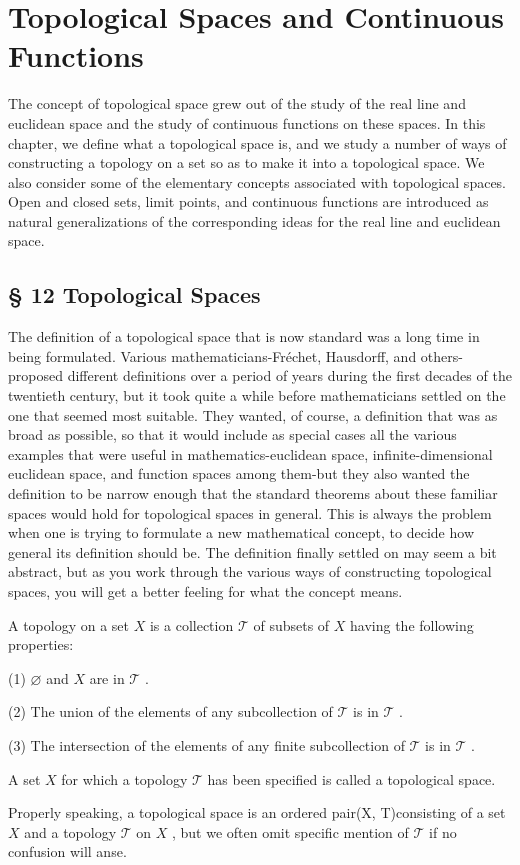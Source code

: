\chapter{Topological Spaces and Continuous Functions}

The concept of topological space grew out of the study of the real line and euclidean space and the study of continuous functions on these spaces. In this chapter, we define what a topological space is, and we study a number of ways of constructing a topology on a set so as to make it into a topological space. We also consider some of the elementary concepts associated with topological spaces. Open and closed sets, limit points, and continuous functions are introduced as natural generalizations of the corresponding ideas for the real line and euclidean space.

\section*{§ 12 Topological Spaces}

The definition of a topological space that is now standard was a long time in being formulated. Various mathematicians-Fréchet, Hausdorff, and others-proposed different definitions over a period of years during the first decades of the twentieth century, but it took quite a while before mathematicians settled on the one that seemed most suitable. They wanted, of course, a definition that was as broad as possible, so that it would include as special cases all the various examples that were useful in mathematics-euclidean space, infinite-dimensional euclidean space, and function spaces among them-but they also wanted the definition to be narrow enough that the standard theorems about these familiar spaces would hold for topological spaces in general. This is always the problem when one is trying to formulate a new mathematical concept, to decide how general its definition should be. The definition finally settled on may seem a bit abstract, but as you work through the various ways of constructing topological spaces, you will get a better feeling for what the concept means.

\begin{definition} A topology on a set \(X\) is a collection \(\mathcal{T}\) of subsets of \(X\) having the following properties:

(1) \(\varnothing\) and \(X\) are in \(\mathcal{T}\) .

(2) The union of the elements of any subcollection of \(\mathcal{T}\) is in \(\mathcal{T}\) .

(3) The intersection of the elements of any finite subcollection of \(\mathcal{T}\) is in \(\mathcal{T}\) .

A set \(X\) for which a topology \(\mathcal{T}\) has been specified is called a topological space.

Properly speaking, a topological space is an ordered pair(X, T)consisting of a set \(X\) and a topology \(\mathcal{T}\) on \(X\) , but we often omit specific mention of \(\mathcal{T}\) if no confusion will anse.
\end{definition}


